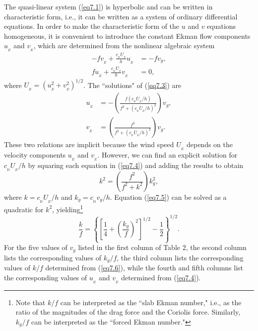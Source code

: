 \documentclass[10pt]{article}
\newcommand{\cD}{c_{_\mathrm{D}}}
\begin{document}
     The quasi-linear system (\ref{eq7.1}) is hyperbolic and
can be written in characteristic form, i.e., it can be written as a system of
ordinary differential equations. In order to make the characteristic form of
the $u$ and $v$ equations homogeneous, it is convenient to introduce the constant
Ekman flow components $u_{_E}$ and $v_{_E}$, which are determined from the nonlinear
algebraic system
\begin{equation}                                  %
  \begin{split}
      - fv_{_E} + \frac{\cD U_{_E}}{h}u_{_E} &= -fv_g,   \\
        fu_{_E} + \frac{\cD U_{_E}}{h}v_{_E} &= 0,
  \end{split}
\label{eq7.3}
\end{equation}
where $U_{_E}=(u_{_E}^2+v_{_E}^2)^{1/2}$. The ``solutions" of (\ref{eq7.3}) are
\begin{equation}                                  %
  \begin{split}
         u_{_E} &= -\left(\frac{f(\cD U_{_E}/h)}{f^2 + (\cD U_{_E}/h)^2}\right)v_g, \\
         v_{_E} &=  \left(\frac{f^2            }{f^2 + (\cD U_{_E}/h)^2}\right)v_g.
  \end{split}
\label{eq7.4}
\end{equation}
These two relations are implicit because the wind speed $U_{_E}$ depends on
the velocity components $u_{_E}$ and $v_{_E}$.
However, we can find an explicit solution for $\cD U_{_E}/h$ by
squaring each equation in (\ref{eq7.4}) and adding the results to obtain
\begin{equation}                                 %
         k^2 = \left(\frac{f^2}{f^2 + k^2}\right) k_g^2,
\label{eq7.5}
\end{equation}
where $k=\cD U_{_E}/h$ and $k_g=\cD v_g/h$. Equation (\ref{eq7.5}) can be solved as a
quadratic for $k^2$, yielding\footnote{Note that $k/f$ can be interpreted as the ``slab
Ekman number," i.e., as the ratio of the magnitudes of the drag force and the Coriolis
force. Similarly, $k_g/f$ can be interpreted as the ``forced Ekman number."}
\begin{equation}                                  %
    \frac{k}{f} = \left\{\left[\frac{1}{4} + \left(\frac{k_g}{f}\right)^2\right]^{1/2}
                             - \frac{1}{2}\right\}^{1/2}.
\label{eq7.6}
\end{equation}
For the five values of $v_g$ listed in the first column of Table 2, the second column
lists the corresponding values of $k_g/f$, the third column lists the corresponding values
of $k/f$ determined from (\ref{eq7.6}), while the fourth and fifth columns list
the corresponding values of $u_{_E}$ and $v_{_E}$ determined from (\ref{eq7.4}).
\end{document}
